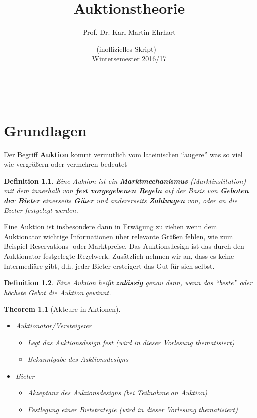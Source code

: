 \documentclass[12pt]{extreport} %
\title{Auktionstheorie}
\author{Prof. Dr. Karl-Martin Ehrhart}
\date{(inoffizielles Skript) ~\vspace{0.2cm} \\ Wintersemester 2016/17}
\makeatletter
\theoremstyle{named}
\newtheorem*{unnamedtheorem*}{Theorem}
\theoremstyle{itshape}
\newtheorem*{definition}{Definition}
\theoremstyle{normal}
\def\maketitle{ \begin{titlepage} 
			~\vspace{3cm} 
		\begin{center} {\Huge \@title} \end{center} 
	 		\vspace*{1cm} 
	 	\begin{center} {\large \@author} \end{center} 
	 	\begin{center} \@date \end{center} 
	 		\vspace*{7cm} 
	 	\begin{center} \@publishers \end{center} 
	 		\vfill 
	\end{titlepage} }
\makeatother
\begin{document}
\begin{titlepage}
	\maketitle
	\thispagestyle{empty}
\end{titlepage}
	
\tableofcontents
\thispagestyle{empty} 
  
\chapter{Grundlagen}

Der Begriff \textbf{Auktion} kommt vermutlich vom lateinischen \enquote{augere} was so viel wie vergrößern oder vermehren bedeutet

\begin{definition}
	Eine Auktion ist ein \textbf{Marktmechanismus} (Marktinstitution) mit dem innerhalb von \textbf{fest vorgegebenen Regeln} auf der Basis von \textbf{Geboten der Bieter} einerseits \textbf{Güter} und andererseits \textbf{Zahlungen} von, oder an die Bieter festgelegt werden.
\end{definition}

Eine Auktion ist insbesondere dann in Erwägung zu ziehen wenn dem Auktionator wichtige Informationen über relevante Größen fehlen, wie zum Beispiel Reservations- oder Marktpreise. Das Auktionsdesign ist das durch den Auktionator festgelegte Regelwerk. Zusätzlich nehmen wir an, dass es keine Intermediäre gibt, d.h. jeder Bieter ersteigert das Gut für sich selbst.

 
\begin{definition}
	Eine Auktion heißt \textbf{zulässig} genau dann, wenn das \enquote{beste} oder höchste Gebot die Auktion gewinnt.
\end{definition}

 
\begin{unnamedtheorem*}[Akteure in Aktionen] ~\
	\begin{itemize}
		\item Auktionator/Versteigerer
			\begin{itemize}
				\item Legt das Auktionsdesign fest (wird in dieser Vorlesung thematisiert)
				\item Bekanntgabe des Auktionsdesigns
			\end{itemize}
		\item Bieter
			\begin{itemize}
				\item Akzeptanz des Auktionsdesigns (bei Teilnahme an Auktion)
				\item Festlegung einer Bietstrategie (wird in dieser Vorlesung thematisiert)
			\end{itemize}
	\end{itemize} 
\end{unnamedtheorem*}
\end{document}
